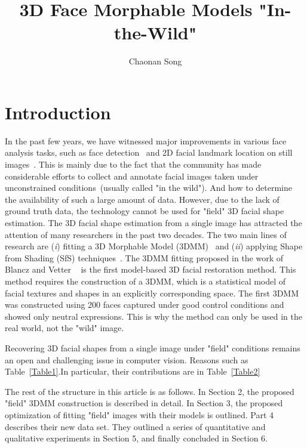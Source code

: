 \documentclass[twocolumn]{article}
\author{Chaonan Song}
\title{3D Face Morphable Models "In-the-Wild"}
\begin{document}
\newcommand{\tabincell}[2]{\begin{tabular}{@{}#1@{}}#2\end{tabular}}
        \maketitle
        \par
        \section{Introduction}
        In the past few years, we have witnessed major improvements in various face analysis tasks, such as face detection~\cite{[19],[42]} and 2D facial landmark location on still images~\cite{[40],[21],[6],[38],[43],[4]}. This is mainly due to the fact that the community has made considerable efforts to collect and annotate facial images taken under unconstrained conditions~\cite{[24],[45],[9],[32],[31]}(usually called "in the wild"). And how to determine the availability of such a large amount of data. However, due to the lack of ground truth data, the technology cannot be used for "field" 3D facial shape estimation. The 3D facial shape estimation from a single image has attracted the attention of many researchers in the past two decades. The two main lines of research are (\emph{i}) fitting a 3D Morphable Model (3DMM)~\cite{[11],[12]} and (\emph{ii}) applying Shape from Shading (SfS) techniques~\cite{[34],[35],[22]}. The 3DMM fitting proposed in the work of Blancz and Vetter ~\cite{[11],[12]} is the first model-based 3D facial restoration method. This method requires the construction of a 3DMM, which is a statistical model of facial textures and shapes in an explicitly corresponding space. The first 3DMM was constructed using 200 faces captured under good control conditions and showed only neutral expressions. This is why the method can only be used in the real world, not the "wild" image.
        \par
        Recovering 3D facial shapes from a single image under "field" conditions remains an open and challenging issue in computer vision. Reasons such as Table~\ref{Table1}.In particular, their contributions are in Table~\ref{Table2}
        \par
        The rest of the structure in this article is as follows. In Section 2, the proposed "field" 3DMM construction is described in detail. In Section 3, the proposed optimization of fitting "field" images with their models is outlined. Part 4 describes their new data set. They outlined a series of quantitative and qualitative experiments in Section 5, and finally concluded in Section 6.
\end{document}
